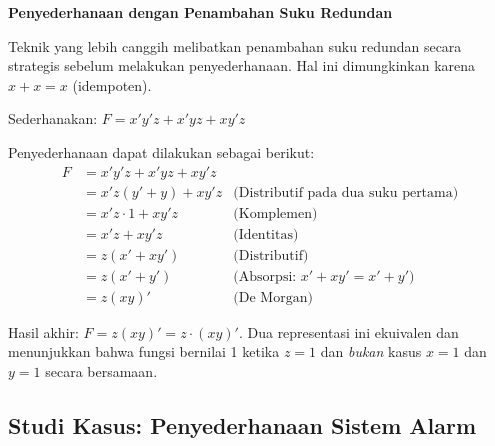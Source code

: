 \begin{contoh}
\textbf{Penyederhanaan dengan Penambahan Suku Redundan}

Teknik yang lebih canggih melibatkan penambahan suku redundan secara strategis sebelum melakukan penyederhanaan. Hal ini dimungkinkan karena $x + x = x$ (idempoten).

Sederhanakan: $F = x'y'z + x'yz + xy'z$

Penyederhanaan dapat dilakukan sebagai berikut:
\begin{align*}
F &= x'y'z + x'yz + xy'z \\
  &= x'z(y' + y) + xy'z & \text{(Distributif pada dua suku pertama)} \\
  &= x'z \cdot 1 + xy'z & \text{(Komplemen)} \\
  &= x'z + xy'z & \text{(Identitas)} \\
  &= z(x' + xy') & \text{(Distributif)} \\
  &= z(x' + y') & \text{(Absorpsi: } x' + xy' = x' + y') \\
  &= z(xy)' & \text{(De Morgan)}
\end{align*}

Hasil akhir: $F = z(xy)' = z \cdot (xy)'$. Dua representasi ini ekuivalen dan menunjukkan bahwa fungsi bernilai 1 ketika $z = 1$ dan \emph{bukan} kasus $x = 1$ dan $y = 1$ secara bersamaan.
\end{contoh}

\subsection{Studi Kasus: Penyederhanaan Sistem Alarm}

